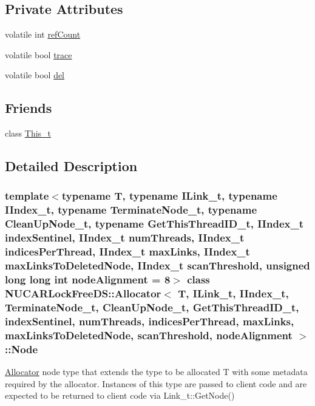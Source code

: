 \subsection*{Private Attributes}
\begin{DoxyCompactItemize}
\item 
volatile int \mbox{\hyperlink{class_n_u_c_a_r_lock_free_d_s_1_1_allocator_1_1_node_a312678ef69212305fcb1a502487ecbf0}{ref\+Count}}
\item 
volatile bool \mbox{\hyperlink{class_n_u_c_a_r_lock_free_d_s_1_1_allocator_1_1_node_a2f124c812c1bff924eb839a4dcd372b8}{trace}}
\item 
volatile bool \mbox{\hyperlink{class_n_u_c_a_r_lock_free_d_s_1_1_allocator_1_1_node_ab5fd866eb1405eb7c5962f7842d6f546}{del}}
\end{DoxyCompactItemize}
\subsection*{Friends}
\begin{DoxyCompactItemize}
\item 
class \mbox{\hyperlink{class_n_u_c_a_r_lock_free_d_s_1_1_allocator_1_1_node_a4580c3239c67ddcfdafff4feae0d9b1d}{This\+\_\+t}}
\end{DoxyCompactItemize}


\subsection{Detailed Description}
\subsubsection*{template$<$typename T, typename I\+Link\+\_\+t, typename I\+Index\+\_\+t, typename Terminate\+Node\+\_\+t, typename Clean\+Up\+Node\+\_\+t, typename Get\+This\+Thread\+I\+D\+\_\+t, I\+Index\+\_\+t index\+Sentinel, I\+Index\+\_\+t num\+Threads, I\+Index\+\_\+t indices\+Per\+Thread, I\+Index\+\_\+t max\+Links, I\+Index\+\_\+t max\+Links\+To\+Deleted\+Node, I\+Index\+\_\+t scan\+Threshold, unsigned long long int node\+Alignment = 8$>$\newline
class N\+U\+C\+A\+R\+Lock\+Free\+D\+S\+::\+Allocator$<$ T, I\+Link\+\_\+t, I\+Index\+\_\+t, Terminate\+Node\+\_\+t, Clean\+Up\+Node\+\_\+t, Get\+This\+Thread\+I\+D\+\_\+t, index\+Sentinel, num\+Threads, indices\+Per\+Thread, max\+Links, max\+Links\+To\+Deleted\+Node, scan\+Threshold, node\+Alignment $>$\+::\+Node}

\mbox{\hyperlink{class_n_u_c_a_r_lock_free_d_s_1_1_allocator}{Allocator}} node type that extends the type to be allocated T with some metadata required by the allocator. Instances of this type are passed to client code and are expected to be returned to client code via Link\+\_\+t\+::\+Get\+Node() 

